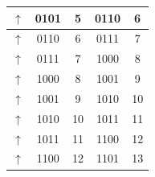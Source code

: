 \documentclass[pdftex,12pt,a4paper]{article}
\begin{document}
\begin{table}[H]
\begin{tabular}{|c|c|c|c|c|}
$\uparrow$                                                     & 0101                                                      & 5                                                         & 0110                                                   & 6                                                       \\ \hline
$\uparrow$                                                     & 0110                                                      & 6                                                         & 0111                                                   & 7                                                       \\ \hline
$\uparrow$                                                     & 0111                                                      & 7                                                         & 1000                                                   & 8                                                       \\ \hline
$\uparrow$                                                     & 1000                                                      & 8                                                         & 1001                                                   & 9                                                       \\ \hline
$\uparrow$                                                     & 1001                                                      & 9                                                         & 1010                                                   & 10                                                      \\ \hline
$\uparrow$                                                     & 1010                                                      & 10                                                        & 1011                                                   & 11                                                      \\ \hline
$\uparrow$                                                     & 1011                                                      & 11                                                        & 1100                                                   & 12                                                      \\ \hline
$\uparrow$                                                     & 1100                                                      & 12                                                        & 1101                                                   & 13                                                      \\ \hline

\end{tabular}
\end{table}
\end{document}
